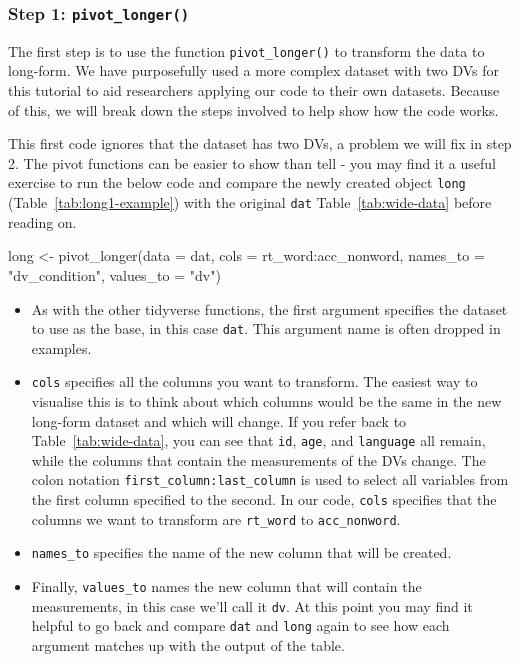 \documentclass[
  english,
  doc,floatsintext]{apa6}
\newenvironment{Shaded}{\begin{snugshade}}{\end{snugshade}}
\newcommand{\AttributeTok}[1]{\textcolor[rgb]{0.77,0.63,0.00}{#1}}
\newcommand{\FunctionTok}[1]{\textcolor[rgb]{0.00,0.00,0.00}{#1}}
\newcommand{\NormalTok}[1]{#1}
\newcommand{\OtherTok}[1]{\textcolor[rgb]{0.56,0.35,0.01}{#1}}
\newcommand{\SpecialCharTok}[1]{\textcolor[rgb]{0.00,0.00,0.00}{#1}}
\newcommand{\StringTok}[1]{\textcolor[rgb]{0.31,0.60,0.02}{#1}}
\begin{document}
\hypertarget{step-1-pivot_longer}{%
\subsubsection{\texorpdfstring{Step 1: \texttt{pivot\_longer()}}{Step 1: pivot\_longer()}}\label{step-1-pivot_longer}}

The first step is to use the function \texttt{pivot\_longer()} to transform the data to long-form. We have purposefully used a more complex dataset with two DVs for this tutorial to aid researchers applying our code to their own datasets. Because of this, we will break down the steps involved to help show how the code works.

This first code ignores that the dataset has two DVs, a problem we will fix in step 2. The pivot functions can be easier to show than tell - you may find it a useful exercise to run the below code and compare the newly created object \texttt{long} (Table~\ref{tab:long1-example}) with the original \texttt{dat} Table~\ref{tab:wide-data} before reading on.

\begin{Shaded}
\begin{Highlighting}[]
\NormalTok{long }\OtherTok{\textless{}{-}} \FunctionTok{pivot\_longer}\NormalTok{(}\AttributeTok{data =}\NormalTok{ dat, }
                     \AttributeTok{cols =}\NormalTok{ rt\_word}\SpecialCharTok{:}\NormalTok{acc\_nonword, }
                     \AttributeTok{names\_to =} \StringTok{"dv\_condition"}\NormalTok{,}
                     \AttributeTok{values\_to =} \StringTok{"dv"}\NormalTok{)}
\end{Highlighting}
\end{Shaded}

\begin{itemize}
\item
  As with the other tidyverse functions, the first argument specifies the dataset to use as the base, in this case \texttt{dat}. This argument name is often dropped in examples.
\item
  \texttt{cols} specifies all the columns you want to transform. The easiest way to visualise this is to think about which columns would be the same in the new long-form dataset and which will change. If you refer back to Table~\ref{tab:wide-data}, you can see that \texttt{id}, \texttt{age}, and \texttt{language} all remain, while the columns that contain the measurements of the DVs change. The colon notation \texttt{first\_column:last\_column} is used to select all variables from the first column specified to the second. In our code, \texttt{cols} specifies that the columns we want to transform are \texttt{rt\_word} to \texttt{acc\_nonword}.
\item
  \texttt{names\_to} specifies the name of the new column that will be created.
\item
  Finally, \texttt{values\_to} names the new column that will contain the measurements, in this case we'll call it \texttt{dv}. At this point you may find it helpful to go back and compare \texttt{dat} and \texttt{long} again to see how each argument matches up with the output of the table.
\end{itemize}
\end{document}
